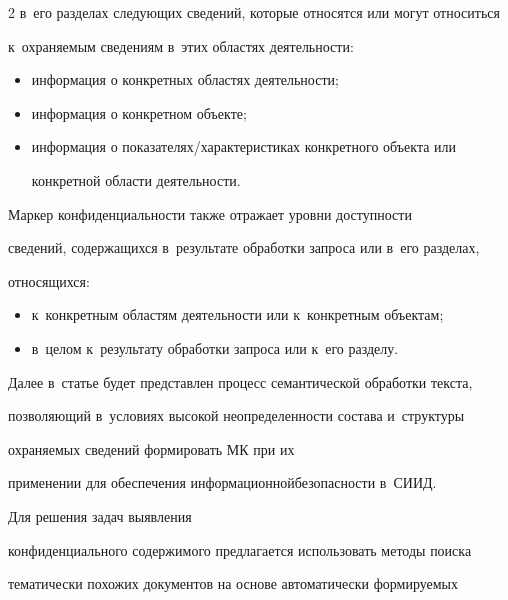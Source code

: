 \begin{multicols}{2}
в~его разделах следующих сведений, которые относятся или могут относиться 


к~охраняемым сведениям в~этих областях деятельности:


  \begin{itemize}


\item информация о конкретных областях деятельности;


\item информация о конкретном объекте;


\item информация о показателях/характеристиках конкретного объекта или 


конкретной области деятельности.


  \end{itemize}


  


  Маркер конфиденциальности также отражает уровни доступности 


сведений, содержащихся в~результате обработки запроса или в~его разделах, 


относящихся:


  \begin{itemize}


  \item к~конкретным областям деятельности или к~конкретным объектам;


\item в~целом к~результату обработки запроса или к~его разделу.


\end{itemize}





  Далее в~статье будет представлен процесс семантической обработки текста, 


позволяющий в~условиях высокой неопределенности состава и~структуры 


охраняемых сведений формировать МК при их 


применении для обеспечения информационной\linebreak безопас\-ности в~СИИД.


 Для решения задач выявления 


конфиденциального содержимого пред\-ла\-га\-ется использовать методы поиска 


тематически похожих документов на основе автоматически формируемых 



\end{multicols}
